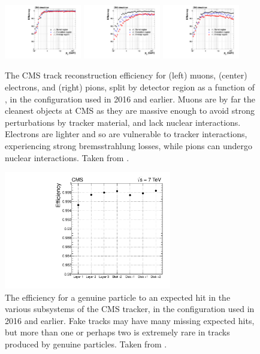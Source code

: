   \begin{figure}[h!]
    \centering
    \includegraphics[width=0.3\textwidth]{figures/mu/efficiencyVsPt.pdf}
    \includegraphics[width=0.3\textwidth]{figures/el/efficiencyVsPt.pdf}
    \includegraphics[width=0.3\textwidth]{figures/pi/efficiencyVsPt.pdf}
    \caption[Track reconstruction efficiency.]{
      The CMS track reconstruction efficiency for (left) muons, (center) electrons, and (right) pions, split by detector region as a function of \pt, in the configuration used in 2016 and earlier. 
      Muons are by far the cleanest objects at CMS as they are massive enough to avoid strong perturbations by tracker material, and lack nuclear interactions.
      Electrons are lighter and so are vulnerable to tracker interactions, experiencing strong bremsstrahlung losses, while pions can undergo nuclear interactions.
      Taken from \cite{cmstracking}.}
    \label{fig:trackefficiency}
  \end{figure}  

  \begin{figure}[h!]
    \centering
    \includegraphics[width=0.65\textwidth]{figures/hitefficiency.pdf}
    \caption[Efficiency for a genuine particle to leave an expected hit in the CMS tracker.]{
      The efficiency for a genuine particle to an expected hit in the various subsystems of the CMS tracker, in the configuration used in 2016 and earlier. 
      Fake tracks may have many missing expected hits, but more than one or perhaps two is extremely rare in tracks produced by genuine particles.
      Taken from \cite{cmstracking}.}
    \label{fig:hitefficiency}
  \end{figure}  

